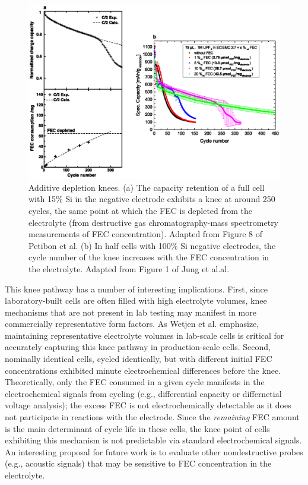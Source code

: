 \documentclass{article}
\begin{document}
\begin{figure}[ht]
\centering
\includegraphics[scale = 0.7]{figures/fec_depletion.eps}
\caption{Additive depletion knees.
(a) The capacity retention of a full cell with 15\% Si in the negative electrode exhibits a knee at around 250 cycles, the same point at which the FEC is depleted from the electrolyte (from destructive gas chromatography-mass spectrometry measurements of FEC concentration). Adapted from Figure 8 of Petibon et al.\cite{petibon_studies_2016}
(b) In half cells with 100\% Si negative electrodes, the cycle number of the knee increases with the FEC concentration in the electrolyte. Adapted from Figure 1 of Jung et al.al.\cite{jung_consumption_2016}}
\label{fig:fec_knee}
\end{figure}

This knee pathway has a number of interesting implications.
First, since laboratory-built cells are often filled with high electrolyte volumes, knee mechanisms that are not present in lab testing may manifest in more commercially representative form factors.
As Wetjen et al.\cite{wetjen_differentiating_2017} emphasize,
maintaining representative electrolyte volumes in lab-scale cells is critical for accurately capturing this knee pathway in production-scale cells.
Second, nominally identical cells, cycled identically, but with different initial FEC concentrations exhibited minute electrochemical differences before the knee.\cite{jung_consumption_2016}
Theoretically, only the FEC consumed in a given cycle manifests in the electrochemical signals from cycling (e.g., differential capacity or differnetial voltage analysis); the excess FEC is not electrochemically detectable as it does not participate in reactions with the electrode.
Since the \emph{remaining} FEC amount is the main determinant of cycle life in these cells, the knee point of cells exhibiting this mechanism is not predictable via standard electrochemical signals.
An interesting proposal for future work is to evaluate other nondestructive probes (e.g., acoustic signals\cite{knehr_understanding_2018}) that may be sensitive to FEC concentration in the electrolyte.
\end{document}
